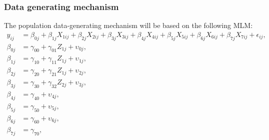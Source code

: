 \documentclass[10pt, a4paper, titlepage]{article}
\begin{document}
\subsubsection{Data generating mechanism}
The population data-generating mechanism will be based on the following MLM:
\begin{subequations}
\label{eq:population}
\begin{align}
y_{ij} &= \beta_{0j} + \beta_{1j}X_{1ij} + \beta_{2j}X_{2ij} + \beta_{3j}X_{3ij} + \beta_{4j}X_{4ij} + \beta_{5j}X_{5ij} + \beta_{6j}X_{6ij} + \beta_{7j}X_{7ij} + \epsilon_{ij}, \tag{4} \\
\beta_{0j} &= \gamma_{00} + \gamma_{01}Z_{1j} + \upsilon_{0j}, \tag{4.1} \\
\beta_{1j} &= \gamma_{10} + \gamma_{11}Z_{1j} + \upsilon_{1j}, \tag{4.2} \\
\beta_{2j} &= \gamma_{20} + \gamma_{21}Z_{1j} + \upsilon_{2j}, \tag{4.3} \\
\beta_{3j} &= \gamma_{30} + \gamma_{32}Z_{2j} + \upsilon_{3j}, \tag{4.4} \\
\beta_{4j} &= \gamma_{40} + \upsilon_{4j}, \tag{4.5} \\
\beta_{5j} &= \gamma_{50} + \upsilon_{5j}, \tag{4.6} \\
\beta_{6j} &= \gamma_{60} + \upsilon_{6j}, \tag{4.7} \\
\beta_{7j} &= \gamma_{70}, \tag{4.8}
\end{align}

\end{subequations}
\end{document}
